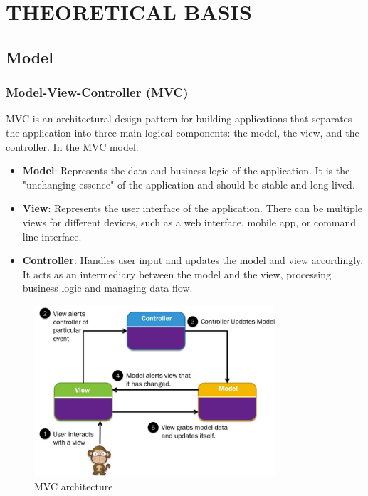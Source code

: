 \section{THEORETICAL BASIS}

\subsection{Model}

\subsubsection{Model-View-Controller (MVC)}

MVC is an architectural design pattern for building applications that separates the application into three main logical components: the model, the view, and the controller. In the MVC model:
\begin{itemize}
    \item \textbf{Model}: Represents the data and business logic of the application. It is the "unchanging essence" of the application and should be stable and long-lived.

    \item \textbf{View}: Represents the user interface of the application. There can be multiple views for different devices, such as a web interface, mobile app, or command line interface.

    \item \textbf{Controller}: Handles user input and updates the model and view accordingly. It acts as an intermediary between the model and the view, processing business logic and managing data flow.
\end{itemize}

\begin{figure}[H]
    \centering
    \includegraphics[width=0.8\textwidth]{assets/images/Research/System/MVC.png}
    \caption{MVC architecture}
    \label{fig:mvc}
\end{figure}

